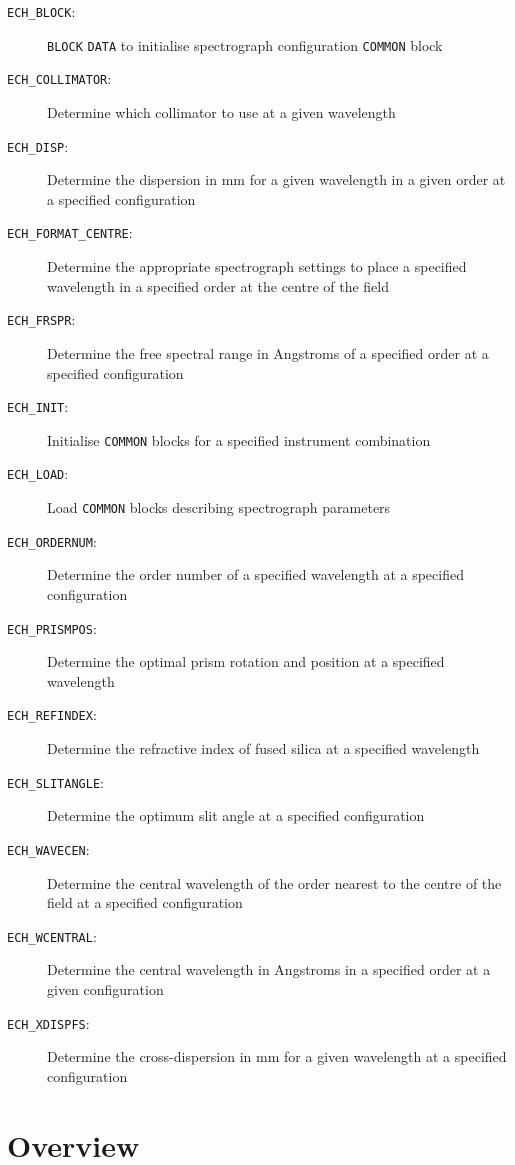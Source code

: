 \documentclass[11pt,twoside,noabs,nolof]{starlink}
\newenvironment{mansectionroutines}{\begin{description}}{\end{description}}
\newcommand{\mansectionitem}[1]{\item[#1:]}
\newcommand{\mantt}[1]{\texttt{#1}}
\begin{document}
\begin{mansectionroutines}
\mansectionitem {{\mantt{ECH\_BLOCK}}}
  {\mantt{BLOCK}} {\mantt{DATA}} to initialise spectrograph configuration
                 {\mantt{COMMON}} block
\mansectionitem {{\mantt{ECH\_COLLIMATOR}}}
  Determine which collimator to use at a given wavelength
\mansectionitem {{\mantt{ECH\_DISP}}}
  Determine the dispersion in mm for a given wavelength
                in a given order at a specified configuration
\mansectionitem {{\mantt{ECH\_FORMAT\_CENTRE}}}
  Determine the appropriate spectrograph settings
                         to place a specified wavelength in a specified order
                         at the centre of the field
\mansectionitem {{\mantt{ECH\_FRSPR}}}
  Determine the free spectral range in Angstroms
                 of a specified order at a specified configuration
\mansectionitem {{\mantt{ECH\_INIT}}}
  Initialise {\mantt{COMMON}} blocks for a specified instrument combination
\mansectionitem {{\mantt{ECH\_LOAD}}}
  Load {\mantt{COMMON}} blocks describing spectrograph parameters
\mansectionitem {{\mantt{ECH\_ORDERNUM}}}
  Determine the order number of a specified wavelength
                    at a specified configuration
\mansectionitem {{\mantt{ECH\_PRISMPOS}}}
  Determine the optimal prism rotation and position
                    at a specified wavelength
\mansectionitem {{\mantt{ECH\_REFINDEX}}}
  Determine the refractive index of fused silica
                    at a specified wavelength
\mansectionitem {{\mantt{ECH\_SLITANGLE}}}
  Determine the optimum slit angle
                     at a specified configuration
\mansectionitem {{\mantt{ECH\_WAVECEN}}}
  Determine the central wavelength of the order
                   nearest to the centre of the field at a specified
                   configuration
\mansectionitem {{\mantt{ECH\_WCENTRAL}}}
  Determine the central wavelength in Angstroms
                    in a specified order at a given configuration
\mansectionitem {{\mantt{ECH\_XDISPFS}}}
  Determine the cross-dispersion in mm for a given wavelength
                   at a specified configuration
\end{mansectionroutines}

\section{Overview}
\end{document}
